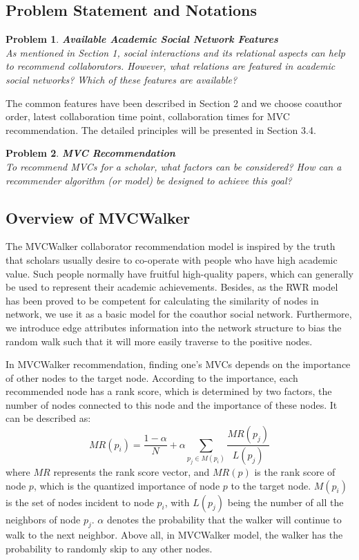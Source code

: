 \documentclass[10pt,journal,compsoc]{IEEEtran}
\newtheorem{problem}{\textbf{Problem}}
\begin{document}
\subsection{Problem Statement and Notations}

\begin{problem}
\textit{\textbf{Available Academic Social Network Features}\\
As mentioned in Section 1, social interactions and its relational aspects can help to recommend collaborators. However, what relations are featured in academic social networks? Which of these features are available? }
\end{problem}

The common features have been described in Section 2 and we choose coauthor order, latest collaboration time point, collaboration times for MVC recommendation. The detailed principles will be presented in Section 3.4.

\begin{problem}
\textit{\textbf{MVC Recommendation}\\
To recommend MVCs for a scholar, what factors can be considered? How can a recommender algorithm (or model) be designed to achieve this goal? }
\end{problem}
\subsection{Overview of MVCWalker}
The MVCWalker collaborator recommendation model is inspired by the truth that scholars usually desire to co-operate with people who have high academic value. Such people normally have fruitful high-quality papers, which can generally be used to represent their academic achievements. Besides, as the RWR model has been proved to be competent for calculating the similarity of nodes in network, we use it as a basic model for the coauthor social network. Furthermore, we introduce edge attributes information into the network structure to bias the random walk such that it will more easily traverse to the positive nodes.

In MVCWalker recommendation, finding one's MVCs depends on the importance of other nodes to the target node. According to the importance, each recommended node has a rank score, which is determined by two factors, the number of nodes connected to this node and the importance of these nodes. It can be described as:
\begin{equation}
MR(p_{i})=\frac{1-\alpha}{N}+\alpha \sum_{p_{j}\in M(p_{i})}\frac{MR(p_{j})}{L(p_{j})}
\end{equation}
where $MR$ represents the rank score vector, and $MR(p)$ is the rank score of node $p$, which is the quantized importance of node $p$ to the target node. $M(p_{i})$ is the set of nodes incident to node $p_{i}$, with $L(p_{j})$ being the number of all the neighbors of node $p_{j}$. $\alpha$ denotes the probability that the walker will continue to walk to the next neighbor. Above all, in MVCWalker model, the walker has the probability to randomly skip to any other nodes.
\end{document}
